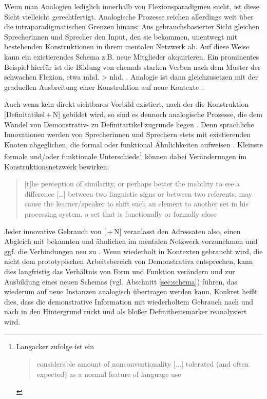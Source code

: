 Wenn man Analogien lediglich innerhalb von Flexionsparadigmen sucht, ist diese Sicht vielleicht gerechtfertigt. Analogische Prozesse reichen allerdings weit über die intraparadigmatischen Grenzen hinaus: Aus gebrauchsbasierter Sicht gleichen Sprecherinnen und Sprecher den Input, den sie bekommen, unentwegt mit bestehenden Konstruktionen in ihrem mentalen Netzwerk ab. Auf diese Weise kann ein existierendes Schema z.B. neue Mitglieder akquirieren. Ein prominentes Beispiel hierfür ist die Bildung von ehemals starken Verben nach dem Muster der schwachen Flexion, etwa mhd.  > nhd.  \parencite[s.][]{Bittner1985}. Analogie ist dann gleichzusetzen mit der graduellen Ausbreitung einer Konstruktion auf neue Kontexte \parencite[57f.]{Bybee2010}. %

Auch wenn kein direkt sichtbares Vorbild existiert, nach der die Konstruktion [Definitatikel\,+\,N] gebildet wird, so sind es dennoch analogische Prozesse, die dem  Wandel von Demonstrativ- zu Definitartikel zugrunde liegen \parencite[eine ähnliche Perspektive nimmt auch Sommerer bei der Entwicklung des engl. Definitartikels ein, s.][]{Sommerer2011}. Denn sprachliche Innovationen werden von Sprecherinnen und Sprechern stets mit existierenden Knoten abgeglichen, die formal oder funktional Ähnlichkeiten aufweisen \parencite[51]{Traugott2013}. Kleinste formale und/oder funktionale Unterschiede\footnote{Langacker zufolge ist ein \blockcquote[69]{Langacker1987}{considerable amount of nonconventionality [...] tolerated (and often expected) as a normal feature of language use}.}
 können dabei Veränderungen im Konstruktionsnetzwerk bewirken:  \blockcquote[324]{Fischer2007} {[t]he perception of similarity, or perhaps better the inability to see a difference […] between two linguistic signs or between two referents, may cause the learner/speaker to shift such an element to another set in his processing system, a set that is functionally or formally close}. Jeder innovative Gebrauch von [\,+\,N] veranlasst den Adressaten also, einen Abgleich mit bekannten und ähnlichen  \parencite[60]{Bybee2010} im mentalen Netzwerk vorzunehmen und ggf. die Verbindungen neu zu . Wenn  wiederholt in Kontexten gebraucht wird, die nicht dem prototypischen Arbeitsbereich von Demonstrativa entsprechen, kann dies langfristig das Verhältnis von Form und Funktion verändern und zur Ausbildung eines neuen Schemas (vgl. Abschnitt \ref{sec:schema}) führen, das wiederum auf neue Instanzen analogisch übertragen werden kann. Konkret heißt dies, dass die demonstrative Information mit wiederholtem Gebrauch nach und nach in den Hintergrund rückt und  als bloßer Definitheitsmarker reanalysiert wird.


